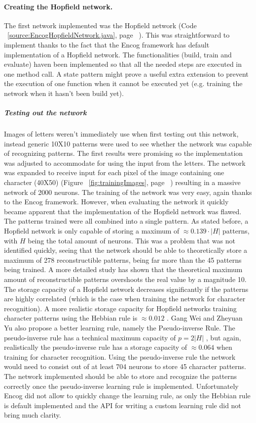\documentclass[pdftex,a4paper,12pt,twoside]{report}
\theoremstyle{plain} \newtheorem{theorem}{Theorem} \newtheorem{proposition}{Proposition} \newtheorem{lemma}{Lemma} \newtheorem*{corollary}{Corollary}
\theoremstyle{definition} \newtheorem{definition}{Definition} \newtheorem{conjecture}{Conjecture} \newtheorem*{example}{Example} \newtheorem{algorithm}{Algorithm}
\theoremstyle{remark} \newtheorem*{remark}{Remark} \newtheorem*{note}{Note} \newtheorem{case}{Case}
\begin{document}
\paragraph{Creating the Hopfield network.}
The first network implemented was the Hopfield network (Code ~\ref{source:EncogHopfieldNetwork.java}, page ~\pageref{source:EncogHopfieldNetwork.java}). This was straightforward to implement thanks to the fact that the Encog framework has default implementation of a Hopfield network. The functionalities (build, train and evaluate) haven been implemented so that all the needed steps are executed in one method call. A state pattern might prove a useful extra extension to prevent the execution of one function when it cannot be executed yet (e.g. training the network when it hasn't been build yet).
\subparagraph{Testing out the network}
Images of letters weren't immediately use  when first testing out this network, instead generic 10X10 patterns were used to see whether the network was capable of recognizing patterns. The first results were promising so the implementation was adjusted to accommodate for using the input from the letters. The network was expanded to receive input for each pixel of the image containing one character (40X50) (Figure ~\ref{fig:trainingImages}, page ~\pageref{fig:trainingImages}) resulting in a massive network of 2000 neurons. The training of the network was very easy, again thanks to the Encog framework. However, when evaluating the network it quickly became apparent that the implementation of the Hopfield network was flawed. The patterns trained were all combined into a single pattern. As stated before, a Hopfield network is only capable of storing a maximum of $\approx  0.139 \cdot |H|$ patterns, with $H$ being the total amount of neurons. This was a problem that was not identified quickly, seeing that the network should be able to theoretically store a maximum of 278 reconstructible patterns, being far more than the 45 patterns being trained. A more detailed study has shown that the theoretical maximum amount of reconstructible patterns overshoots the real value by a magnitude 10. The storage capacity of a Hopfield network decreases significantly if the patterns are highly correlated (which is the case when training the network for character recognition). A more realistic storage capacity for Hopfield networks training character patterns using the Hebbian rule is $\approx 0.012$ \citep{Gang}. Gang Wei and Zheyuan Yu also propose a better learning rule, namely the Pseudo-inverse Rule. The pseudo-inverse rule has a technical maximum capacity of $p = 2|H|$ \citep{Gardner}, but again, realistically the pseudo-inverse rule has a storage capacity of $\approx 0.064$ when training for character recognition. Using the pseudo-inverse rule the network would need to consist out of at least 704 neurons to store 45 character patterns. The network implemented should be able to store and recognize the patterns correctly once the pseudo-inverse learning rule is implemented. Unfortunately Encog did not allow to quickly change the learning rule, as only the Hebbian rule is default implemented and the API for writing a custom learning rule did not bring much clarity.
\end{document}
